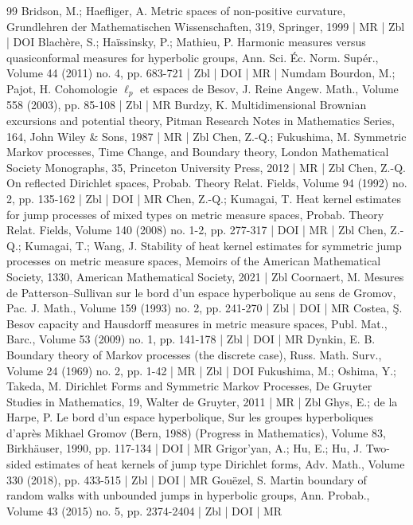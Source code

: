 \documentclass[10pt]{amsart}
\theoremstyle{definition}\newtheorem{defi}[theo]{Definition}\newtheorem{rema}[theo]{Remark}\newtheorem{exam}[theo]{Example}\newtheorem{exem}[theo]{Example}\newtheorem{nota}[theo]{Notation}
\begin{document}
\begin{thebibliography}{99}
 Bridson, M.; Haefliger, A. Metric spaces of non-positive curvature, Grundlehren der Mathematischen Wissenschaften, 319, Springer, 1999 | MR | Zbl | DOI
 Blachère, S.; Haïssinsky, P.; Mathieu, P. Harmonic measures versus quasiconformal measures for hyperbolic groups, Ann. Sci. Éc. Norm. Supér., Volume 44 (2011) no. 4, pp. 683-721 | Zbl | DOI | MR | Numdam
 Bourdon, M.; Pajot, H. Cohomologie $\ell _p$ et espaces de Besov, J. Reine Angew. Math., Volume 558 (2003), pp. 85-108 | Zbl | MR
 Burdzy, K. Multidimensional Brownian excursions and potential theory, Pitman Research Notes in Mathematics Series, 164, John Wiley \& Sons, 1987 | MR | Zbl
 Chen, Z.-Q.; Fukushima, M. Symmetric Markov processes, Time Change, and Boundary theory, London Mathematical Society Monographs, 35, Princeton University Press, 2012 | MR | Zbl
 Chen, Z.-Q. On reflected Dirichlet spaces, Probab. Theory Relat. Fields, Volume 94 (1992) no. 2, pp. 135-162 | Zbl | DOI | MR
 Chen, Z.-Q.; Kumagai, T. Heat kernel estimates for jump processes of mixed types on metric measure spaces, Probab. Theory Relat. Fields, Volume 140 (2008) no. 1-2, pp. 277-317 | DOI | MR | Zbl
 Chen, Z.-Q.; Kumagai, T.; Wang, J. Stability of heat kernel estimates for symmetric jump processes on metric measure spaces, Memoirs of the American Mathematical Society, 1330, American Mathematical Society, 2021 | Zbl
 Coornaert, M. Mesures de Patterson–Sullivan sur le bord d’un espace hyperbolique au sens de Gromov, Pac. J. Math., Volume 159 (1993) no. 2, pp. 241-270 | Zbl | DOI | MR
 Costea, Ş. Besov capacity and Hausdorff measures in metric measure spaces, Publ. Mat., Barc., Volume 53 (2009) no. 1, pp. 141-178 | Zbl | DOI | MR
 Dynkin, E. B. Boundary theory of Markov processes (the discrete case), Russ. Math. Surv., Volume 24 (1969) no. 2, pp. 1-42 | MR | Zbl | DOI
 Fukushima, M.; Oshima, Y.; Takeda, M. Dirichlet Forms and Symmetric Markov Processes, De Gruyter Studies in Mathematics, 19, Walter de Gruyter, 2011 | MR | Zbl
 Ghys, E.; de la Harpe, P. Le bord d’un espace hyperbolique, Sur les groupes hyperboliques d’après Mikhael Gromov (Bern, 1988) (Progress in Mathematics), Volume 83, Birkhäuser, 1990, pp. 117-134 | DOI | MR
 Grigor’yan, A.; Hu, E.; Hu, J. Two-sided estimates of heat kernels of jump type Dirichlet forms, Adv. Math., Volume 330 (2018), pp. 433-515 | Zbl | DOI | MR
 Gouëzel, S. Martin boundary of random walks with unbounded jumps in hyperbolic groups, Ann. Probab., Volume 43 (2015) no. 5, pp. 2374-2404 | Zbl | DOI | MR

\end{thebibliography}
\end{document}

